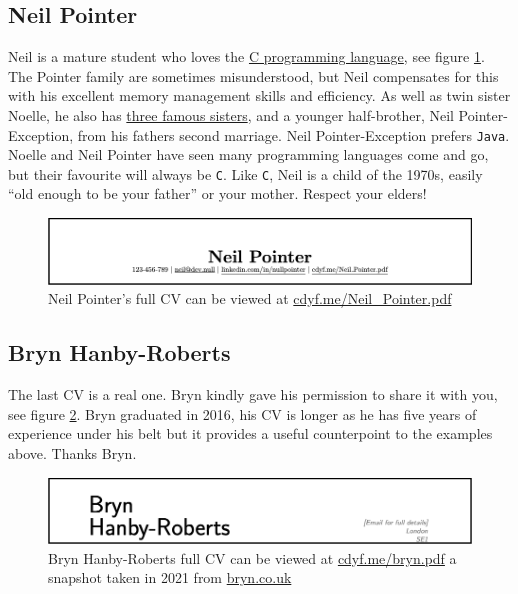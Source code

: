 \documentclass[
]{book}
\begin{document}
\hypertarget{neil-pointer}{%
\subsection{Neil Pointer}\label{neil-pointer}}

Neil is a mature student who loves the \href{https://en.wikipedia.org/wiki/C_(programming_language)}{C programming language}, see figure \ref{fig:neilpointer-fig}. The Pointer family are sometimes misunderstood, but Neil compensates for this with his excellent memory management skills and efficiency. As well as twin sister Noelle, he also has \href{https://en.wikipedia.org/wiki/The_Pointer_Sisters}{three famous sisters}, \citep{imsoexcited} and a younger half-brother, Neil Pointer-Exception, from his fathers second marriage. Neil Pointer-Exception prefers \texttt{Java}. Noelle and Neil Pointer have seen many programming languages come and go, but their favourite will always be \texttt{C}. Like \texttt{C}, Neil is a child of the 1970s, easily ``old enough to be your father'' or your mother. Respect your elders! \citep{ritchie}

\begin{figure}

{\centering \includegraphics[width=1\linewidth]{images/neil_pointer} 

}

\caption{Neil Pointer's full CV can be viewed at \href{https://www.cdyf.me/Neil_Pointer.pdf}{cdyf.me/Neil\_Pointer.pdf}}\label{fig:neilpointer-fig}
\end{figure}



\hypertarget{bryn}{%
\subsection{Bryn Hanby-Roberts}\label{bryn}}

The last CV is a real one. Bryn kindly gave his permission to share it with you, see figure \ref{fig:bryn-fig}. Bryn graduated in 2016, his CV is longer as he has five years of experience under his belt but it provides a useful counterpoint to the examples above. Thanks Bryn. 🙏

\begin{figure}

{\centering \includegraphics[width=1\linewidth]{images/bryn} 

}

\caption{Bryn Hanby-Roberts full CV can be viewed at \href{https://www.cdyf.me/bryn.pdf}{cdyf.me/bryn.pdf} a snapshot taken in 2021 from \href{http://bryn.co.uk}{bryn.co.uk}}\label{fig:bryn-fig}
\end{figure}
\end{document}
